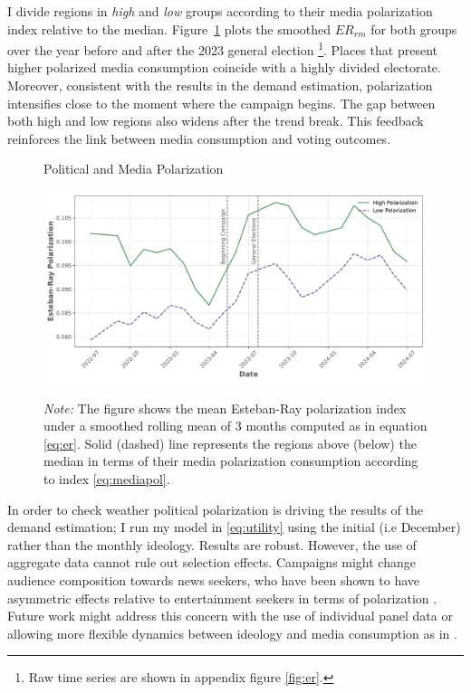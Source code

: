 \documentclass[12pt]{article}
\begin{document}
I divide regions in \textit{high} and \textit{low} groups according to their media polarization index relative to the median. Figure~\ref{fig:er1} plots the smoothed  \(ER_{rm}\)
for both groups over the year before and after the 2023 general election \footnote{Raw time series are shown in appendix figure \ref{fig:er}.}. Places that present higher polarized media consumption coincide with a highly divided electorate. Moreover, consistent with the results in the demand estimation, polarization intensifies close to the moment where the campaign begins. The gap between both high and low regions also widens after the trend break. This feedback reinforces the link between media consumption and voting outcomes. 



\begin{figure}[ht!]

	\centering
		\caption{Political and Media Polarization}
	\includegraphics[width=150mm]{figures/er_polarization_stata_group}
				\label{fig:er1}
	\caption*{\textit{Note:} \small The figure shows the mean Esteban-Ray polarization index under a smoothed rolling mean of 3 months computed as in equation \ref{eq:er}.  Solid (dashed) line represents the regions above (below) the median in terms of their media polarization consumption according to index \ref{eq:mediapol}.   }

\end{figure}

 In order to check weather political polarization is driving the results of the demand estimation; I run my model in \ref{eq:utility} using the initial (i.e December) rather than the monthly ideology. Results are robust.  However, the use of aggregate data cannot rule out selection effects. Campaigns might change audience composition towards news seekers, who have been shown to have asymmetric effects relative to entertainment seekers in terms of polarization \citep{levendusky,arceneaux_johnson_2013}. Future work might address this concern with the use of individual panel data or allowing more flexible dynamics between ideology and media consumption as in \cite{martin2017}.
\end{document}
